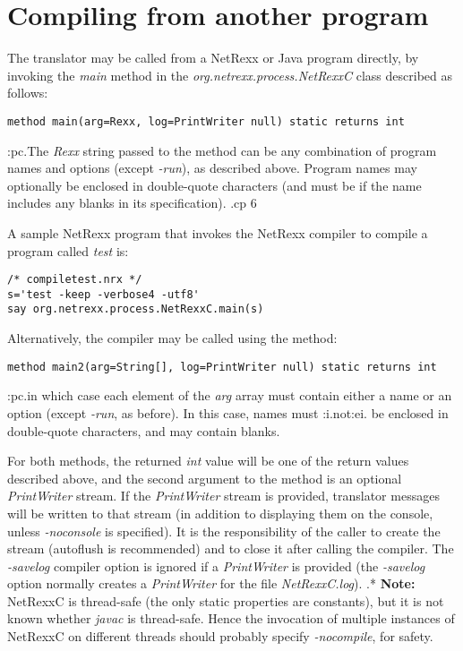 \section{Compiling from another program}

The translator may be called from a NetRexx or Java program directly, by
invoking the \emph{main} method in the \emph{org.netrexx.process.NetRexxC}
class described as follows:
\begin{verbatim}
method main(arg=Rexx, log=PrintWriter null) static returns int
\end{verbatim}
:pc.The \emph{Rexx} string passed to the method can be any combination of
program names and options (except \emph{-run}), as described above.
Program names may optionally be enclosed in double-quote characters (and
must be if the name includes any blanks in its specification).
.cp 6

A sample NetRexx program that invokes the NetRexx compiler to compile a
program called \emph{test} is:
\begin{verbatim}
/* compiletest.nrx */
s='test -keep -verbose4 -utf8'
say org.netrexx.process.NetRexxC.main(s)
\end{verbatim}

Alternatively, the compiler may be called using the method:
\begin{verbatim}
method main2(arg=String[], log=PrintWriter null) static returns int
\end{verbatim}
:pc.in which case each element of the \emph{arg} array must contain
either a name or an option (except \emph{-run}, as before).  In this
case, names must :i.not:ei. be enclosed in double-quote characters, and
may contain blanks.

For both methods, the returned \emph{int} value will be one of the
return values described above, and the second argument to the method is
an optional \emph{PrintWriter} stream.  If the \emph{PrintWriter} stream
is provided, translator messages will be written to that stream (in
addition to displaying them on the console, unless \emph{-noconsole} is
specified).
It is the responsibility of the caller to create the stream (autoflush
is recommended) and to close it after calling the compiler.
The \emph{-savelog} compiler option is ignored if a \emph{PrintWriter}
is provided (the \emph{-savelog} option normally creates
a \emph{PrintWriter} for the file \emph{NetRexxC.log}).
.*
\textbf{Note:} NetRexxC is thread-safe (the only static properties are constants), but
it is not known whether \emph{javac} is thread-safe.  Hence the
invocation of multiple instances of NetRexxC on different threads should
probably specify \emph{-nocompile}, for safety.

